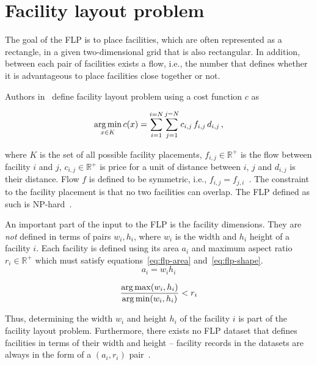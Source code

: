 \section{Facility layout problem}\label{sec:facility-layout-problem}

The goal of the FLP is to place facilities, which are often represented as a rectangle,
in a given two-dimensional grid that is also rectangular.
In addition, between each pair of facilities exists a flow, i.e., the number that defines whether it is advantageous to place facilities close together or not.

Authors in~\cite{goncalvesBiasedRandomkeyGenetic2015} define facility layout problem using a cost function $c$ as

\begin{equation}
    \operatorname*{arg\,min}_{x \in K} c(x) = \sum\limits_{i=1}^{i=N}\sum\limits_{j=1}^{j=N}c_{i,j}\,f_{i,j}\,d_{i,j}\,,
    \label{eq:flp-objective}
\end{equation}

where $K$ is the set of all possible facility placements, $f_{i,j} \in \mathbb{R^+}$ is the flow between facility $i$ and $j$, $c_{i,j} \in \mathbb{R^+}$
is price for a unit of distance between $i$, $j$ and $d_{i,j}$ is their distance.
Flow $f$ is defined to be symmetric, i.e., $f_{i,j} = f_{j,i}$~\cite{goncalvesBiasedRandomkeyGenetic2015, dunkerCoevolutionaryAlgorithmFacility2003}.
The constraint to the facility placement is that no two facilities can overlap.
The FLP defined as such is NP-hard~\cite{liuMultiobjectiveParticleSwarm2018, goncalvesBiasedRandomkeyGenetic2015, friedrichIntegratedSlicingTree2018}.

An important part of the input to the FLP is the facility dimensions.
They are \textit{not} defined in terms of pairs $w_i, h_i$, where $w_i$ is the width and $h_i$ height of a facility $i$.
Each facility is defined using its area $a_i$ and maximum aspect ratio $r_i \in \mathbb{R^+}$ which must satisfy equations~\ref{eq:flp-area} and~\ref{eq:flp-shape}.
\begin{equation}
    a_i = w_i h_i
    \label{eq:flp-area}
\end{equation}

\begin{equation}
    \dfrac{\operatorname*{arg\,max}(w_i, h_i)}{\operatorname*{arg\,min}(w_i, h_i)} < r_i
    \label{eq:flp-shape}
\end{equation}

Thus, determining the width $w_i$ and height $h_i$ of the facility $i$ is part of the facility layout problem.
Furthermore, there exists no FLP dataset that defines facilities in terms of their width and height
– facility records in the datasets are always in the form of a $(a_i, r_i)$ pair~\cite{tamHierarchicalApproachFacility1991, dunkerCoevolutionaryAlgorithmFacility2003, liuSequencepairRepresentationMIPmodelbased2007}.

